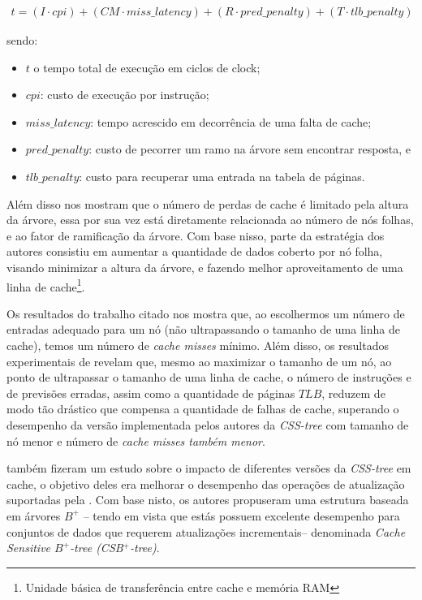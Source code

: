\begin{eqnarray*}
    t = (I \cdot cpi) + (CM \cdot miss\_latency) + (R \cdot pred\_penalty) + (T \cdot tlb\_penalty) 
\end{eqnarray*}

sendo:

\begin{itemize}
    \item $t$ o tempo total de execução em ciclos de clock;
    \item $cpi$: custo de execução por instrução;
    \item $miss\_latency$:  tempo acrescido em decorrência de uma falta de cache;
    \item $pred\_penalty$: custo de pecorrer um ramo na árvore sem encontrar resposta, e
    \item $tlb\_penalty$: custo para recuperar uma entrada na  tabela de páginas.
\end{itemize}

Além disso \citet{paper-effect-node-size-cache-b-trees} nos mostram que o número de perdas de cache é limitado pela altura  da árvore,  essa por sua vez está diretamente relacionada ao número de nós folhas, e ao fator de ramificação da árvore. Com base nisso, parte da estratégia dos autores consistiu em aumentar a quantidade de dados coberto por nó folha, visando minimizar a altura da árvore, e fazendo melhor aproveitamento de uma linha de cache\footnote{Unidade básica de transferência entre cache e memória RAM}. 
 
Os resultados do trabalho citado nos mostra que, ao escolhermos um número de entradas adequado para um nó (não ultrapassando o tamanho de uma linha de cache), temos um número de \textit{cache misses} mínimo.  Além disso, os resultados experimentais de \citet{paper-effect-node-size-cache-b-trees}  revelam que, mesmo ao maximizar o tamanho de um nó, ao ponto de ultrapassar o tamanho de uma linha de cache, o número de instruções e de previsões erradas, assim como a quantidade de páginas $TLB$, reduzem de modo tão drástico que compensa a quantidade de falhas de cache, superando o desempenho da versão implementada pelos autores da \textit{CSS-tree} com tamanho de nó menor e número de \textit{cache misses também menor}.

 \citet{paper-making-btree-cache} também fizeram um estudo sobre o impacto de diferentes versões da \textit{CSS-tree} em cache, o objetivo deles era melhorar o desempenho das operações de atualização suportadas pela . Com base nisto, os autores propuseram uma estrutura baseada em árvores $B^+$ -- tendo em vista que estás possuem excelente desempenho para conjuntos de dados que requerem atualizações incrementais-- denominada  \textit{Cache Sensitive $B^+$-tree (CSB$^+$-tree)}.

